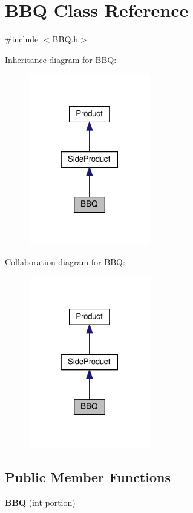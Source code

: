 \hypertarget{classBBQ}{}\section{B\+BQ Class Reference}
\label{classBBQ}


{\ttfamily \#include $<$B\+B\+Q.\+h$>$}



Inheritance diagram for B\+BQ\+:
\nopagebreak
\begin{figure}[H]
\begin{center}
\leavevmode
\includegraphics[width=150pt]{classBBQ__inherit__graph}
\end{center}
\end{figure}


Collaboration diagram for B\+BQ\+:
\nopagebreak
\begin{figure}[H]
\begin{center}
\leavevmode
\includegraphics[width=150pt]{classBBQ__coll__graph}
\end{center}
\end{figure}
\subsection*{Public Member Functions}
\begin{DoxyCompactItemize}
\item 
\mbox{\label{classBBQ_ae61d496afe48742d20202cc59ab8ee6f}} 
{\bfseries B\+BQ} (int portion)
\end{DoxyCompactItemize}
